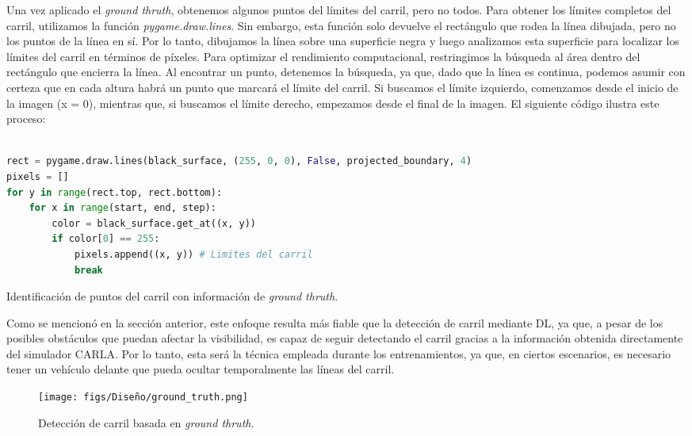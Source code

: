 Una vez aplicado el \textit{ground thruth}, obtenemos algunos puntos del límites del carril, pero no todos. Para obtener los límites completos del carril, utilizamos la función \textit{pygame.draw.lines}. Sin embargo, esta función solo devuelve el rectángulo que rodea la línea dibujada, pero no los puntos de la línea en sí. Por lo tanto, dibujamos la línea sobre una superficie negra y luego analizamos esta superficie para localizar los límites del carril en términos de píxeles. Para optimizar el rendimiento computacional, restringimos la búsqueda al área dentro del rectángulo que encierra la línea. Al encontrar un punto, detenemos la búsqueda, ya que, dado que la línea es continua, podemos asumir con certeza que en cada altura habrá un punto que marcará el límite del carril. Si buscamos el límite izquierdo, comenzamos desde el inicio de la imagen (x = 0), mientras que, si buscamos el límite derecho, empezamos desde el final de la imagen. El siguiente código ilustra este proceso:
\begin{code}[h]
\begin{lstlisting}[language=Python]

rect = pygame.draw.lines(black_surface, (255, 0, 0), False, projected_boundary, 4)
pixels = []
for y in range(rect.top, rect.bottom):
    for x in range(start, end, step):
        color = black_surface.get_at((x, y))
        if color[0] == 255:
            pixels.append((x, y)) # Limites del carril
            break

\end{lstlisting}
\caption[Identificación de puntos del carril con información de \textit{ground thruth}]{Identificación de puntos del carril con información de \textit{ground thruth}.}
\label{cod:gt_carril}
\end{code}

Como se mencionó en la sección anterior, este enfoque resulta más fiable que la detección de carril mediante \ac{DL}, ya que, a pesar de los posibles obstáculos que puedan afectar la visibilidad, es capaz de seguir detectando el carril gracias a la información obtenida directamente del simulador CARLA. Por lo tanto, esta será la técnica empleada durante los entrenamientos, ya que, en ciertos escenarios, es necesario tener un vehículo delante que pueda ocultar temporalmente las líneas del carril.

\begin{figure}[ht]
  \centering
  \texttt{[image: figs/Diseño/ground\_truth.png]}
  \caption{Detección de carril basada en \textit{ground thruth}.}
  \label{fig:gt_final_carril}
\end{figure}

